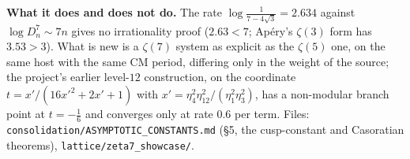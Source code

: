 \documentclass[10pt]{article}
\begin{document}
\textbf{What it does and does not do.} The rate $\log\frac1{7-4\sqrt3}=2.634$ against $\log D_n^7\sim7n$ gives no irrationality proof ($2.63<7$; Ap\'ery's $\zeta(3)$ form has $3.53>3$). What is new is a $\zeta(7)$ system as explicit as the $\zeta(5)$ one, on the same host with the same CM period, differing only in the weight of the source; the project's earlier level-$12$ construction, on the coordinate $t=x'/(16x'^2+2x'+1)$ with $x'=\eta_4^2\eta_{12}^2/(\eta_1^2\eta_3^2)$, has a non-modular branch point at $t=-\tfrac16$ and converges only at rate $0.6$ per term. Files: \texttt{consolidation/ASYMPTOTIC\_CONSTANTS.md} (\S5, the cusp-constant and Casoratian theorems), \texttt{lattice/zeta7\_showcase/}.
\end{document}
